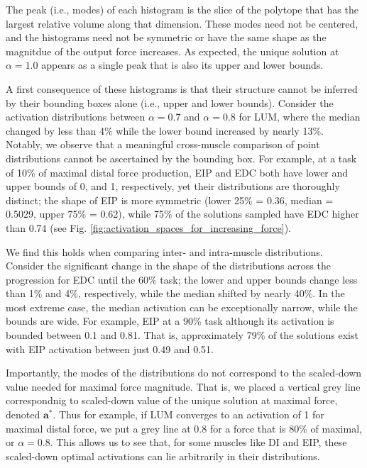\documentclass[10pt,letterpaper]{article}
\begin{document}
The peak (i.e., modes) of each histogram is the slice of the polytope that has the largest relative volume along that dimension. These modes need not be centered, and the histograms need not be symmetric or have the same shape as the magnitdue of the output force increases.
As expected, the unique solution at $\alpha=1.0$ appears as a single peak that is also its upper and lower bounds.

A first consequence of these histograms is that their structure cannot be inferred by their bounding boxes alone (i.e., upper and lower bounds).
Consider the activation distributions between $\alpha = 0.7$ and $\alpha = 0.8$ for LUM, where the median changed by less than 4\% while the lower bound increased by nearly 13\%.
Notably, we observe that a meaningful cross-muscle comparison of point distributions cannot be ascertained by the bounding box. For example, at a task of 10\% of maximal distal force production, EIP and EDC both have lower and upper bounds of 0, and 1, respectively, yet their distributions are thoroughly distinct; the shape of EIP is more symmetric (lower 25\% = 0.36, median = 0.5029, upper 75\% = 0.62), while 75\% of the solutions sampled have EDC higher than 0.74 (see Fig. \ref{fig:activation_spaces_for_increasing_force}). 

We find this holds when comparing inter- and intra-muscle distributions. Consider the significant change in the shape of the distributions across the progression for EDC until the 60\% task; the lower and upper bounds change less than 1\% and 4\%, respectively, while the median shifted by nearly 40\%.
In the most extreme case, the median activation can be exceptionally narrow, while the bounds are wide. For example, EIP at a 90\% task although its activation is bounded between 0.1 and 0.81. That is, approximately 79\% of the solutions exist with EIP activation between just 0.49 and 0.51.

Importantly, the modes of the distributions do not correspond to the scaled-down value needed for maximal force magnitude.  That is, we  placed a vertical grey line correspondnig to scaled-down value of the unique solution at maximal force, denoted $\textbf{a}^*$. Thus for example, if LUM converges to an activation of 1 for maximal distal force, we put a grey line at 0.8 for a force that is 80\% of maximal, or  $\alpha=0.8$.
This allows us to see that, for some muscles like DI and EIP, these scaled-down optimal activations can lie arbitrarily in their distributions.
\end{document}
